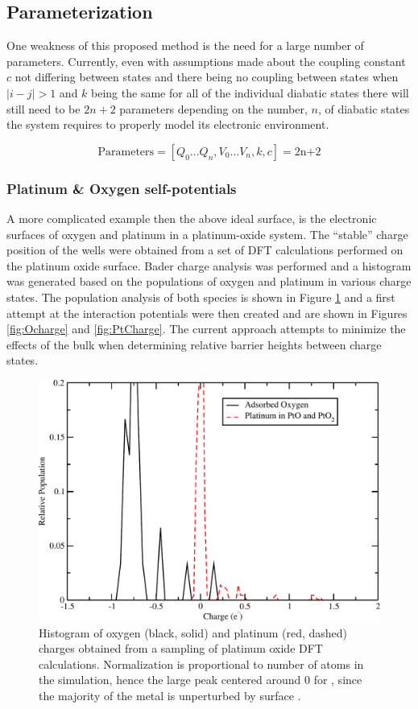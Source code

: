 \subsection{Parameterization}
One weakness of this proposed method is the need for a large number of
parameters.  Currently, even with assumptions made about the coupling constant
$c$ not differing between states and there being no coupling between states
when $|i-j| > 1$  and $k$ being the same for all of the individual diabatic
states there will still need to be $2n+2$ parameters depending on the number, $n$, of
diabatic states the system requires to properly model its electronic
environment.

\begin{equation*}
\text{Parameters} = [Q_0 \dots Q_n, V_0 \dots V_n, k, c] = \text{2n+2}
\end{equation*}

\subsubsection{Platinum \& Oxygen self-potentials}
A more complicated example then the above ideal surface, is the electronic surfaces
of oxygen and platinum in a platinum-oxide system.  The ``stable'' charge
position of the wells were obtained from a set of DFT calculations performed on
the platinum oxide surface. Bader charge analysis was performed and a histogram
was generated based on the populations of oxygen and platinum in various charge
states. The population analysis of both species is shown in Figure
\ref{fig:population} and a first attempt at the interaction potentials were
then created and are shown in Figures \ref{fig:Ocharge} and \ref{fig:PtCharge}.
The current approach attempts to minimize the effects of the bulk  when
determining relative barrier heights between charge states.

\begin{figure}
  \centering
  \includegraphics[width=0.75\linewidth]{../figures/chap5/chgDist_PtO.pdf}
  \caption{Histogram of oxygen (black, solid) and platinum (red, dashed)
charges obtained from a sampling of platinum oxide DFT calculations.
Normalization is proportional to number of atoms in the simulation, hence the
large peak centered around 0 for , since the majority of the metal is
unperturbed by surface .}
\label{fig:population}
\end{figure}

